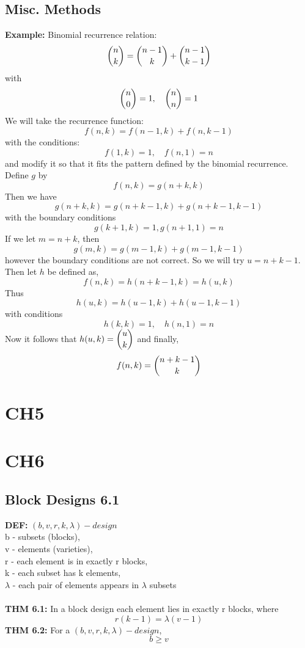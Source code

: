 \documentclass[12pt]{article}
\begin{document}
	\subsection{Misc. Methods}
	\textbf{Example: } Binomial recurrence relation: 
	\[
		\dbinom{n}{k} = \dbinom{n-1}{k} + \dbinom{n-1}{k-1}
	\] with 
	\[
		\dbinom{n}{0} = 1, \quad \dbinom{n}{n} = 1
	\]
	We will take the recurrence function: 
	\[
		f(n,k) = f(n-1, k) + f(n, k-1)
	\]
	with the conditions: 
	\[
		f(1,k) = 1, \quad f(n, 1) = n
	\]
	and modify it so that it fits the pattern defined by the binomial recurrence. Define $ g $ by 
	\[
		f(n,k) = g(n+k, k)
	\]
	Then we have 
	\[
		g(n+k, k) = g(n+k-1, k) + g(n + k-1, k-1)
	\]
	with the boundary conditions 
	\[
		g(k+1, k) = 1, g(n+1, 1) = n
	\]
	If we let $ m= n+k $, then 
	\[ g(m,k) = g(m-1, k) + g(m-1,k-1) \]
	however the boundary conditions are not correct. So we will try $ u=n+k-1 $. Then let $ h $ be defined as, 
	\[
		f(n,k) = h(n+k-1, k) = h(u,k)
	\]
	Thus
	\[
		h(u,k) = h(u-1, k) + h(u-1, k-1)
	\]
	with conditions 
	\[
		h(k,k) = 1, \quad h(n,1)= n
	\]
	Now it follows that $ h(u,k) = \dbinom{u}{k} $ and finally, 
	\[
		f(n,k) = \dbinom{n+k-1}{k}
	\]
	\section{CH5}
	\section{CH6}
	\subsection{Block Designs 6.1}
	\textbf{DEF:} $ (b,v,r,k,\lambda)-design $ \\
	b - subsets (blocks),\\
	v - elements (varieties),\\
	r - each element is in exactly r blocks, \\
	k - each subset has k elements, \\
	$ \lambda $ - each pair of elements appears in $ \lambda $ subsets\\\\
	\textbf{THM 6.1:} In a block design each element lies in exactly r blocks, where
	\[ 	r(k-1) = \lambda(v-1) \]
	\textbf{THM 6.2:}  For a  $ (b,v,r,k,\lambda)-design $, 
	\[ b \geq v \]
	
\end{document}
